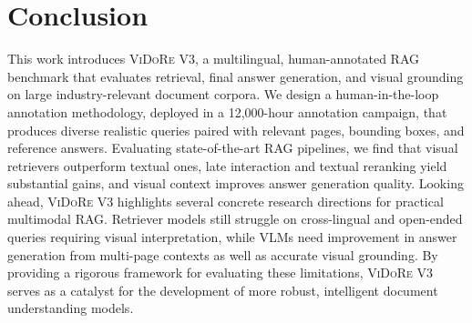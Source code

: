 

\flushbottom
\section{Conclusion}

This work introduces \textsc{ViDoRe} V3, a multilingual, human-annotated RAG benchmark that evaluates retrieval, final answer generation, and visual grounding on large industry-relevant document corpora. We design a human-in-the-loop annotation methodology, deployed in a 12,000-hour annotation campaign, that produces diverse realistic queries paired with relevant pages, bounding boxes, and reference answers. Evaluating state-of-the-art RAG pipelines, we find that visual retrievers outperform textual ones, late interaction and textual reranking yield substantial gains, and visual context improves answer generation quality. Looking ahead, \textsc{ViDoRe} V3 highlights several concrete research directions for practical multimodal RAG. Retriever models still struggle on cross-lingual and open-ended queries requiring visual interpretation, while VLMs need improvement in answer generation from multi-page contexts as well as accurate visual grounding. By providing a rigorous framework for evaluating these limitations, \textsc{ViDoRe} V3 serves as a catalyst for the development of more robust, intelligent document understanding models.
